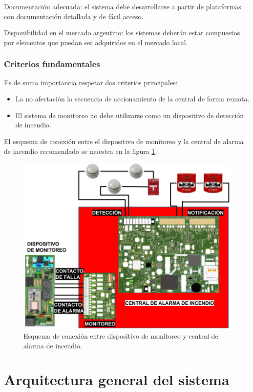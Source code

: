Documentación adecuada:  el sistema debe desarrollarse a partir de plataformas con documentación detallada y de fácil acceso.

Disponibilidad en el mercado argentino: los sistemas deberán estar compuestos por elementos que puedan ser adquiridos en el mercado local.

\subsubsection{Criterios fundamentales}

Es de suma importancia respetar dos criterios principales:
\begin{itemize}
\item La no afectación la secuencia de accionamiento de la central de forma remota. 
\item El sistema de monitoreo no debe utilizarse como un dispositivo de detección de incendio.
\end{itemize}

El esquema de conexión entre el dispositivo de monitoreo y la central de alarma de incendio recomendado
se muestra en la figura \ref{fig:figura_b3}.

\begin{figure}[]
	\centering
	\includegraphics[scale=.35]{./Figures/Capitulo3/Fig_B3.png}
	\caption{Esquema de conexión entre dispositivo de monitoreo y central de alarma de incendio.}
	\label{fig:figura_b3}
\end{figure}

\section{Arquitectura general del sistema}

